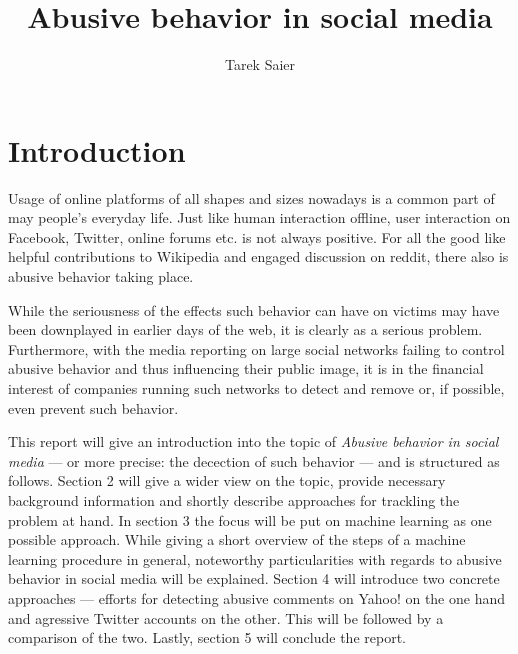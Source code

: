 \documentclass{proseminar}
\begin{document}

\title{Abusive behavior in social media}

\author{
Tarek Saier\\
}

\maketitle

\section{Introduction}
Usage of online platforms of all shapes and sizes nowadays is a common part of may people's everyday life. Just like human interaction offline, user interaction on Facebook, Twitter, online forums etc. is not always positive. For all the good like helpful contributions to Wikipedia and engaged discussion on reddit, there also is abusive behavior taking place.

While the seriousness of the effects such behavior can have on victims may have been downplayed in earlier days of the web, it is clearly as a serious problem. Furthermore, with the media reporting on large social networks failing to control abusive behavior and thus influencing their public image, it is in the financial interest of companies running such networks to detect and remove or, if possible, even prevent such behavior.

This report will give an introduction into the topic of \emph{Abusive behavior in social media} --- or more precise: the decection of such behavior --- and is structured as follows. Section 2 will give a wider view on the topic, provide necessary background information and shortly describe approaches for trackling the problem at hand. In section 3 the focus will be put on machine learning as one possible approach. While giving a short overview of the steps of a machine learning procedure in general, noteworthy particularities with regards to abusive behavior in social media will be explained. Section 4 will introduce two concrete approaches --- efforts for detecting abusive comments on Yahoo! on the one hand and agressive Twitter accounts on the other. This will be followed by a comparison of the two. Lastly, section 5 will conclude the report.
\end{document}
